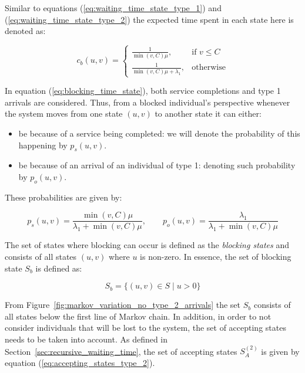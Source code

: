 Similar to equations (\ref{eq:waiting_time_state_type_1}) and
(\ref{eq:waiting_time_state_type_2}) the expected time spent in each state here
is denoted as:

\begin{equation}\label{eq:blocking_time_state}
    c_b(u,v) =
    \begin{cases}
        \frac{1}{\min(v,C) \mu}, & \text{if } v \leq C\\
        \frac{1}{\min(v,C) \mu + \lambda_1}, & \text{otherwise}
    \end{cases}
\end{equation}

In equation (\ref{eq:blocking_time_state}), both service completions and
type 1 arrivals are considered.
Thus, from a blocked individual's perspective whenever the system moves from one
state \((u,v)\) to another state it can either:

\begin{itemize}
    \item be because of a service being completed: we will denote the
    probability of this happening by \(p_s(u,v)\).
    \item be because of an arrival of an individual of type 1: denoting such
    probability by \(p_o(u,v)\).
\end{itemize}

These probabilities are given by:

\begin{equation}\label{eq:blocking_time_probs}
    p_s(u,v) = \frac{\min(v,C)\mu}{\lambda_1 + \min(v,C)\mu}, \qquad
    p_o(u,v) = \frac{\lambda_1}{\lambda_1 + \min(v,C)\mu}
\end{equation}




The set of states where blocking can occur is defined as the \textit{blocking
states} and consists of all states \((u,v)\) where \(u\) is non-zero.
In essence, the set of blocking state \(S_b\) is defined as:

\begin{equation}\label{eq:blocking_states}
    S_b = \{(u,v) \in S \; | \; u > 0\}
\end{equation}

From Figure~\ref{fig:markov_variation_no_type_2_arrivals} the set \(S_b\)
consists of all states below the first line of Markov chain.
In addition, in order to not consider individuals that will be lost to the
system, the set of accepting states needs to be taken into account.
As defined in Section~\ref{sec:recursive_waiting_time}, the set of accepting
states \(S_A^{(2)}\) is given by equation (\ref{eq:accepting_states_type_2}).

